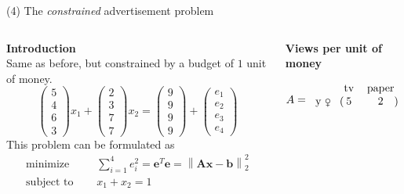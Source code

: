 \documentclass[11pt, aspectratio=149]{beamer}
\theoremstyle{plain}
\newcommand{\norm}[1]{\left\lVert#1\right\rVert}
\begin{document}
\begin{frame}[fragile, t]{(4) The \emph{constrained} advertisement problem}
	\begin{columns}
		\begin{column}{0.6\textwidth}
			\textbf{Introduction}\\ \vspace*{0.5em} 
			Same as before, but constrained by a budget of $1$ unit of money.
			\begin{equation*}
			\begin{pmatrix}
			5\\ 
			4\\ 
			6\\ 
			3
			\end{pmatrix}
			x_1
			+
			\begin{pmatrix}
			2\\ 
			3\\ 
			7\\ 
			7
			\end{pmatrix}
			x_2
			=
			\begin{pmatrix}
			9 \\ 
			9\\ 
			9\\ 
			9
			\end{pmatrix}
			+
			\begin{pmatrix}
			e_1 \\ 
			e_2\\ 
			e_3\\ 
			e_4
			\end{pmatrix}
			\end{equation*}
			This problem can be formulated as
			\begin{align*}
			\text{minimize } \quad & \sum_{i=1}^{4} e_i^2 = 
			\mathbf{e}^T \mathbf{e}
			=
			\norm{ \mathbf{A} \mathbf{x} - \mathbf{b} }_2^2 \\
			\text{subject to } \quad & x_1 + x_2 = 1 
			\end{align*}
		\end{column}
		\begin{column}{0.4\textwidth}%
			\begin{center}
				\textbf{Views per unit of money}
			\end{center}
			\[
			A = 
			\begin{blockarray}{rcc}
			& \text{tv} & \text{paper}  \\
			\begin{block}{l(cc)}
			\text{y \female}  & 5 &  2 \\

\end{block}
\end{blockarray}\]
\end{column}
\end{columns}
\end{frame}
\end{document}
